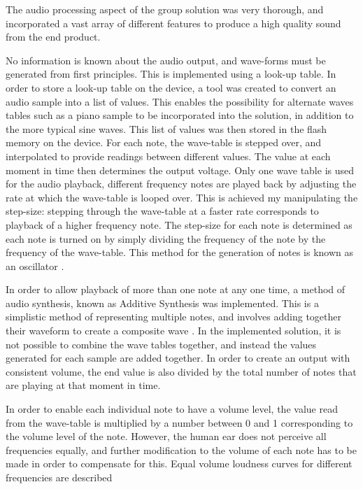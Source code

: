 The audio processing aspect of the group solution was very thorough, and 
incorporated a vast array of different features to produce a high quality sound 
from the end product.
\par\bigskip\noindent
No information is known about the audio output, and wave-forms must be generated 
from first principles. This is implemented using a look-up table. 
In order to store a look-up table on the device, a tool was created to convert 
an audio sample into a list of values. This enables the possibility for alternate 
waves tables such as a piano sample to be incorporated into the solution, in 
addition to the more typical sine waves. This list of values was then stored in 
the flash memory on the device.
For each note, the wave-table is stepped over, and interpolated to provide readings 
between different values. 
The value at each moment in time then determines the output voltage. 
Only one wave table is used for the audio playback, different frequency notes are 
played back by adjusting the rate at which the wave-table is looped over. This is 
achieved my manipulating the step-size: stepping through the wave-table at a 
faster rate corresponds to playback of a higher frequency note. The step-size 
for each note is determined as each note is turned on by simply dividing the 
frequency of the note by the frequency of the wave-table. This method for the 
generation of notes is known as an oscillator \cite{puckette2007theory}.
\par\bigskip\noindent
In order to allow playback of more than one note at any one time, a method of 
audio synthesis, known as Additive Synthesis was implemented. This is a simplistic
method of representing multiple notes, and involves adding together their 
waveform to create a composite wave \cite{miranda2012computer}. In the 
implemented solution, it is not possible to combine the wave tables together, 
and instead the values generated for each sample are added together. 
In order to create an output with consistent volume, the end value is also 
divided by the total number of notes that are playing at that moment in time. 
\par\bigskip\noindent
In order to enable each individual note to have a volume level, the 
value read from the wave-table is multiplied by a number between 0 and 1 
corresponding to the volume level of the note. 
However, the human ear does not perceive all frequencies equally, and further 
modification to the volume of each note has to be made in order to compensate 
for this. Equal volume loudness curves for different frequencies are described 
